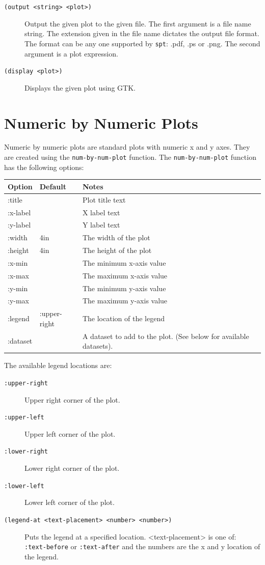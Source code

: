 \documentclass{article}
\begin{document}
\begin{description}

\item[{\tt (output <string> <plot>)}]
Output the given plot to the given
file.  The first argument is a file name string.  The extension given
in the file name dictates the output file format.  The format can be
any one supported by {\tt spt}: .pdf, .ps or .png.  The second
argument is a plot expression.

\item [{\tt (display <plot>)}] Displays the given plot using GTK.
\end{description}


\section{Numeric by Numeric Plots}

Numeric by numeric plots are standard plots with numeric x and y
axes.  They are created using the {\tt num-by-num-plot} function.  The
{\tt num-by-num-plot} function has the following options:

\begin{center}
\begin{tabular}{lll}
Option & Default & Notes \\
\hline
:title & & Plot title text\\
:x-label & & X label text\\
:y-label & & Y label text\\
:width & 4in & The width of the plot\\
:height & 4in & The height of the plot\\
:x-min & & The minimum x-axis value\\
:x-max & & The maximum x-axis value\\
:y-min & & The minimum y-axis value\\
:y-max & & The maximum y-axis value\\
:legend & :upper-right & The location of the legend \\
:dataset & & A dataset to add to the plot.  (See below for available
datasets).\\
\end{tabular}
\end{center}

The available legend locations are:

\begin{description}
\item[{\tt :upper-right}] Upper right corner of the plot.
\item[{\tt :upper-left}] Upper left corner of the plot.
\item[{\tt :lower-right}] Lower right corner of the plot.
\item[{\tt :lower-left}] Lower left corner of the plot.
\item[{\tt (legend-at <text-placement> <number> <number>)}] Puts the
  legend at a specified location.  <text-placement> is one of: {\tt
    :text-before} or {\tt :text-after} and the numbers are the x and y
  location of the legend.
\end{description}
\end{document}
